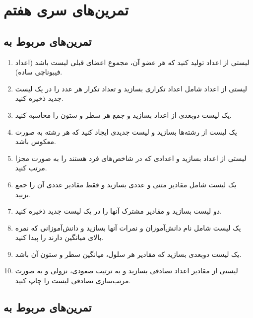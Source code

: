 \documentclass[a4paper,12pt]{article}
\begin{document}
	
	
	\newpage
	\section*{تمرین‌های سری هفتم}
	
	\subsection*{تمرین‌های مربوط به }
	
	\begin{enumerate}
		\item لیستی از اعداد تولید کنید که هر عضو آن، مجموع اعضای قبلی لیست باشد (اعداد فیبوناچی ساده).
		\item لیستی از اعداد شامل اعداد تکراری بسازید و تعداد تکرار هر عدد را در یک لیست جدید ذخیره کنید.
		\item یک لیست دو‌بعدی از اعداد بسازید و جمع هر سطر و ستون را محاسبه کنید.
		\item یک لیست از رشته‌ها بسازید و لیست جدیدی ایجاد کنید که هر رشته به صورت معکوس باشد.
		\item لیستی از اعداد بسازید و اعدادی که در شاخص‌های فرد هستند را به صورت مجزا مرتب کنید.
		\item یک لیست شامل مقادیر متنی و عددی بسازید و فقط مقادیر عددی آن را جمع بزنید.
		\item دو لیست بسازید و مقادیر مشترک آنها را در یک لیست جدید ذخیره کنید.
		\item یک لیست شامل نام دانش‌آموزان و نمرات آنها بسازید و دانش‌آموزانی که نمره بالای میانگین دارند را پیدا کنید.
		\item یک لیست دو‌بعدی بسازید که مقادیر هر سلول، میانگین سطر و ستون آن باشد.
		\item لیستی از مقادیر اعداد تصادفی بسازید و به ترتیب صعودی، نزولی و به صورت مرتب‌سازی تصادفی لیست را چاپ کنید.
	\end{enumerate}
	
	\subsection*{تمرین‌های مربوط به }
	
\end{document}
